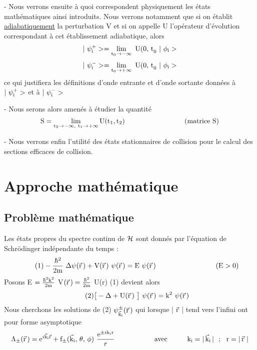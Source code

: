 - Nous verrons ensuite à quoi correspondent physiquement les
états mathématiques ainsi introduits. Nous verrons notamment que si on
établit \ul{adiabatiquement} la perturbation V et si on appelle U l'opérateur
d'évolution correspondant à cet établissement adiabatique, alors
\[
|\ \psi_\mt{i}^+>=\lim_{\mt{t}_0\to-\infty}\mt{ U(0, t}_0\ |\ \phi_\mt{i}>
\]
\[
|\ \psi_\mt{i}^->=\lim_{\mt{t}_0\to+\infty}\mt{ U(0, t}_0\ |\ \phi_\mt{i}>
\]
ce qui justifiera les définitions d'onde entrante et d'onde sortante données à
$|\ \psi_\mt{i}^+>$ et à $|\ \psi_\mt{i}^->$

- Nous serons alors amenés à étudier la quantité 
\[
\mt{S}=\lim_{ \mt{t}_2\to-\infty,\ \mt{t}_1\to+\infty}
\mt{U}(\mt{t}_1,\mt{t}_2) \hspace{3cm} \mt{(matrice S)}
\]

- Nous verrons enfin l'utilité des états stationnaires de collision
pour le calcul des sections efficaces de collision.

\section{Approche mathématique}%
\subsection{Problème mathématique}%
Les états propres du spectre continu de $\mathcal{H}$ sont donnés par
l'équation de Schrödinger indépendante du temps :
\[
\tag{1}-\frac{\hbar^2}{2\mt{m}}\ \Delta\psi(\vec{\mt{r}}\,) + \mt{V}(\vec{\mt{r}}\,)\ \psi(\vec{\mt{r}}\,)
 = \mt{E}\ \psi(\vec{\mt{r}}\,) \hspace{3cm} (\mt{E}>0)
\]
Posons \hspace{1.5cm} E $=\frac{\hbar^2\text{k}^2}{2\text{m}}$ \hspace{1.5cm}
V$(\vec{\text{r}}\,)=\frac{\hbar^2}{2\text{m}}$ U(r) \hspace{1.5cm}
(1) devient alors
\[
\tag{2}\big[-\Delta + \mt{U}(\vec{\mt{r}}\,)\ \big]\ \psi(\vec{\mt{r}}\,)=\mt{k}^2\ \psi(\vec{\mt{r}}\,)
\]
Nous cherchons les solutions de (2) $\psi_{\vec{\text{k}}_{\text{i}}}^\pm(\vec{\text{r}}\,)$ qui
lorsque | $\vec{\text{r}}$ | tend vers l'infini ont pour forme asymptotique
\[
\Lambda_\pm(\vec{\mt{r}}\,)=\mt{e}^{i\vec{\mt{k}}_\mt{i}\vec{\mt{r}}}
+ \mt{f}_\pm(\vec{\mt{k}}_\mt{i},\,\theta,\,\phi)\ \frac{\mt{e}^{\pm i \mt{k}_\mt{i}\mt{r}}}{r}
\hspace{2cm} \mt{avec} \hspace{1cm} \mt{k}_\mt{i}=|\,\vec{\mt{k}}_\mt{i}\,| \ \ ;\ \ \mt{r}=|\,\vec{\mt{r}}\ |
\]


